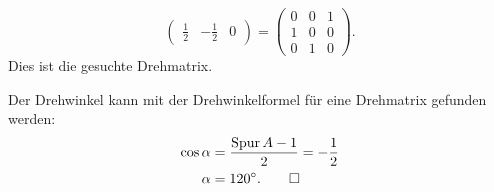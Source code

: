 \begin{loesung}
\begin{teilaufgaben}
\[\begin{pmatrix}
\frac12&-\frac12&      0
\end{pmatrix}
=
\begin{pmatrix}
0&0&1\\
1&0&0\\
0&1&0
\end{pmatrix}.
\]
Dies ist die gesuchte Drehmatrix.
\item
Der Drehwinkel kann mit der Drehwinkelformel für eine Drehmatrix
gefunden werden:
\begin{align*}
\cos\alpha
&=
\frac{\operatorname{Spur}A-1}{2}
=
-\frac12
\\
\alpha&=120^\circ.
\qedhere
\end{align*}
\end{teilaufgaben}
\end{loesung}
